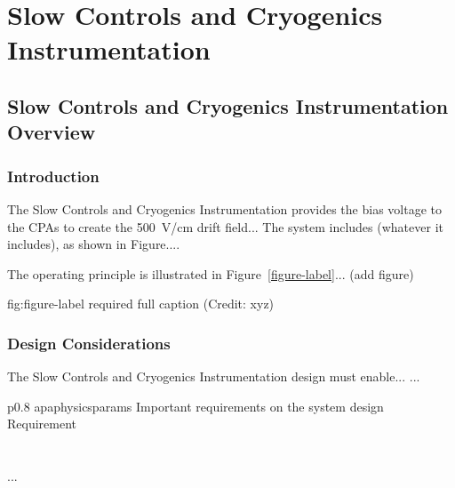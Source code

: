 \chapter{Slow Controls and Cryogenics Instrumentation}
\label{ch:fdsp-slow-cryo}

\section{Slow Controls and Cryogenics Instrumentation Overview}
\label{sec:fdsp-slow-cryo-ov}


\subsection{Introduction}
\label{sec:fdsp-slow-cryo-intro}

The Slow Controls and Cryogenics Instrumentation provides the bias voltage to the CPAs to create the \SI{500}{V/cm} drift field...
The system includes (whatever it includes), as shown in Figure.... 


The operating principle is illustrated in Figure~\ref{figure-label}... (add figure)

\begin{dunefigure}{fig:figure-label}
{required full caption (Credit: xyz)}
\end{dunefigure}

\subsection{Design Considerations}
\label{sec:fdsp-slow-cryo-des-consid}


The Slow Controls and Cryogenics Instrumentation design must enable... 
...


\begin{dunetable}
{p{0.8\textwidth}}
{apaphysicsparams}
{Important requirements on the system design}   
Requirement  \\ \toprowrule
  \\ \colhline
   \\ \colhline
 ...\\ 
\end{dunetable}

